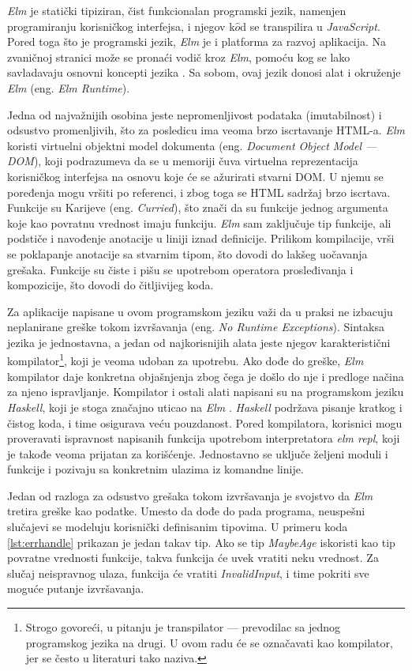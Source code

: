 \documentclass[12pt,oneside]{memoir}
\begin{document}
\par \emph{Elm} je statički tipiziran, čist funkcionalan programski jezik, namenjen programiranju korisničkog interfejsa, i njegov k$\hat{o}$d se transpilira u \emph{JavaScript}. Pored toga što je programski jezik, \emph{Elm} je i platforma za razvoj aplikacija. Na zvaničnoj stranici može se pronaći vodič kroz \emph{Elm}, pomoću kog se lako savladavaju osnovni koncepti jezika \cite{elm-lang-official}. Sa sobom, ovaj jezik donosi alat i okruženje \emph{Elm} (eng. \emph{Elm Runtime}). 
\par Jedna od najvažnijih osobina jeste nepromenljivost podataka (imutabilnost) i odsustvo promenljivih, što za posledicu ima veoma brzo iscrtavanje HTML-a. \emph{Elm} koristi virtuelni objektni model dokumenta (eng. \emph{Document Object Model --- DOM}), koji podrazumeva da se u memoriji čuva virtuelna reprezentacija korisničkog interfejsa na osnovu koje će se ažurirati stvarni DOM. U njemu se poređenja mogu vršiti po referenci, i zbog toga se HTML sadržaj brzo iscrtava. Funkcije su Karijeve (eng. \emph{Curried}), što znači da su funkcije jednog argumenta koje kao povratnu vrednost imaju funkciju. \emph{Elm} sam zaključuje tip funkcije, ali podstiče i navođenje anotacije u liniji iznad definicije. Prilikom kompilacije, vrši se poklapanje anotacije sa stvarnim tipom, što dovodi do lakšeg uočavanja grešaka. Funkcije su čiste i pišu se upotrebom operatora prosleđivanja i kompozicije, što dovodi do čitljivijeg koda.
\par Za aplikacije napisane u ovom programskom jeziku važi da u praksi ne izbacuju neplanirane greške tokom izvršavanja (eng. \emph{No Runtime Exceptions}). Sintaksa jezika je jednostavna, a jedan od najkorisnijih alata jeste njegov karakteristični kompilator\footnote{Strogo govoreći, u pitanju je transpilator --- prevodilac sa jednog programskog jezika na drugi. U ovom radu će se označavati kao kompilator, jer se često u literaturi tako naziva.}, koji je veoma udoban za upotrebu. Ako dođe do greške, \emph{Elm} kompilator daje konkretna objašnjenja zbog čega je došlo do nje i predloge načina za njeno ispravljanje. Kompilator i ostali alati napisani su na programskom jeziku \emph{Haskell}, koji je stoga značajno uticao na \emph{Elm} \cite{haskell}. \emph{Haskell} podržava pisanje kratkog i čistog koda, i time osigurava veću pouzdanost. Pored kompilatora, korisnici mogu proveravati ispravnost napisanih funkcija upotrebom interpretatora \emph{elm repl}, koji je takođe veoma prijatan za korišćenje. Jednostavno se uključe željeni moduli i funkcije i pozivaju sa konkretnim ulazima iz komandne linije.
\par Jedan od razloga za odsustvo grešaka tokom izvršavanja je svojstvo da \emph{Elm} tretira greške kao podatke. Umesto da dođe do pada programa, neuspešni slučajevi se modeluju korisnički definisanim tipovima. U primeru koda \ref{lst:errhandle} prikazan je jedan takav tip. Ako se tip \emph{MaybeAge} iskoristi kao tip povratne vrednosti funkcije, takva funkcija će uvek vratiti neku vrednost. Za slučaj neispravnog ulaza, funkcija će vratiti \emph{InvalidInput}, i time pokriti sve moguće putanje izvršavanja. 
\end{document}
